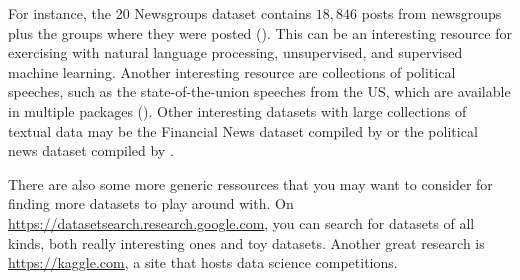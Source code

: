For instance, the 20 Newsgroups dataset contains $18,846$ posts from
newsgroups plus the groups where they were posted
(). This can be an interesting resource for
exercising with natural language processing, unsupervised, and
supervised machine learning. Another interesting resource are
collections of political speeches, such as the state-of-the-union
speeches from the US, which are available in multiple packages
().
Other interesting datasets with large collections of textual data may
be the Financial News dataset compiled by \cite{Chen2017} or the
political news dataset compiled by \cite{Horne2018}.






There are also some more generic ressources that you may want to consider for finding
more datasets to play around with. On  \url{https://datasetsearch.research.google.com},
you can search for datasets of all kinds, both really interesting ones and toy datasets.
Another great research is \url{https://kaggle.com}, a site that hosts data
science competitions.




